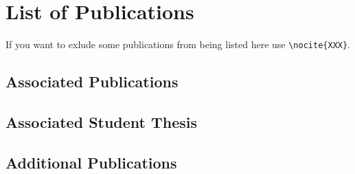 \chapter*{List of Publications}
\label{sec:lop}

If you want to exlude some publications from being listed here use \verb|\nocite{XXX}|.

\BiblatexSplitbibDefernumbersWarningOff
\section*{Associated Publications}
\printbibliography[keyword={mine},heading=none]%

\section*{Associated Student Thesis}
\printbibliography[keyword={student},heading=none]%

\section*{Additional Publications}
\printbibliography[keyword={helped},heading=none]%